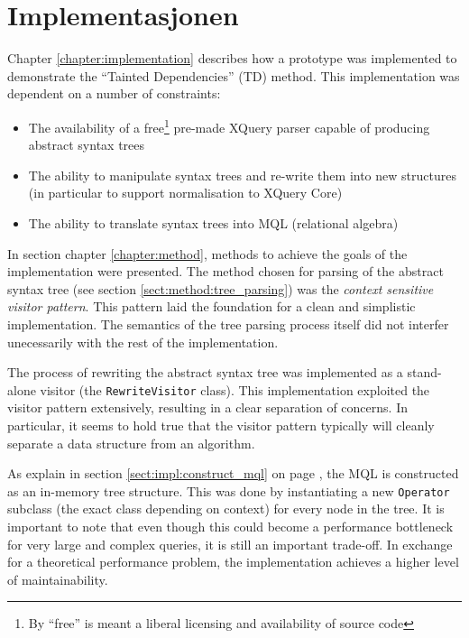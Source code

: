 \section{Implementasjonen}
\label{sect:disc:contextSens}
Chapter \ref{chapter:implementation} describes how a prototype was implemented
to demonstrate the ``Tainted Dependencies'' (TD) method. This implementation
was dependent on a number of constraints:
\begin{itemize}
  \item The availability of a free\footnote{By ``free'' is meant a liberal
  licensing and availability of source code} pre-made XQuery parser capable of
  producing abstract syntax trees
  \item The ability to manipulate syntax trees and re-write them into new
  structures (in particular to support normalisation to XQuery Core)
  \item The ability to translate syntax trees into MQL (relational algebra)
\end{itemize}

In section chapter \ref{chapter:method}, methods to achieve the goals
of the implementation were presented. The method chosen for parsing of the
abstract syntax tree (see section \ref{sect:method:tree_parsing}) was the
\emph{context sensitive visitor pattern}. This pattern laid the foundation for
a clean and simplistic implementation. The semantics of the tree parsing process
itself did not interfer unecessarily with the rest of the implementation.

The process of rewriting the abstract syntax tree was implemented as a
stand-alone visitor (the \texttt{RewriteVisitor} class). This implementation
exploited the visitor pattern extensively, resulting in a clear separation of
concerns. In particular, it seems to hold true that the visitor pattern
typically will cleanly separate a data structure from an algorithm.

As explain in section \ref{sect:impl:construct_mql} on page
\pageref{sect:impl:construct_mql}, the MQL is constructed as an in-memory tree
structure. This was done by instantiating a new \texttt{Operator} subclass
(the exact class depending on context) for every node in the tree. It is
important to note that even though this could become a performance bottleneck
for very large and complex queries, it is still an important trade-off. In
exchange for a theoretical performance problem, the implementation achieves a
higher level of maintainability.